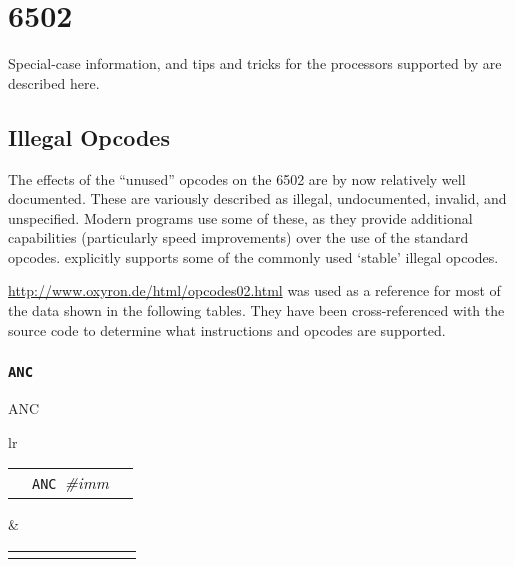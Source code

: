 \label{changelog20200901_nop3}

\chapter{6502}

Special-case information, and tips and tricks for the processors supported by \dasm are described here.

\label{changelog:20200904illegal}
\section{Illegal Opcodes}

The effects of the ``unused'' opcodes on the 6502 are by now relatively well documented. These are variously described as illegal, undocumented, invalid, and unspecified. Modern programs use some of these, as they provide additional capabilities (particularly speed improvements) over the use of the standard opcodes. \dasm explicitly supports some of the commonly used `stable' illegal opcodes.

\url{http://www.oxyron.de/html/opcodes02.html} was used as a reference for most of the data shown in the following tables. They have been cross-referenced with the \dasm source code to determine what instructions and opcodes are supported.

\iffalse
\subsection{\texttt{ANC}}
\begin{usage}
 ANC 
\end{usage}

\begin{table}[H]
\begin{tabular}{lr}

\begin{tabular}{llc}

\mono{\$0B}&\texttt{ANC }\emph{\#imm}&\mono{A:=A \& \#\{imm\}}\\

\end{tabular}&

\tabcolsep=0.1cm
\begin{tabular}{|cccccccc|}
\hline
\scriptsize\mono{N}&
\scriptsize\mono{V}&
\scriptsize\mono{B}&
\scriptsize\mono{D}&
\scriptsize\mono{I}&
\scriptsize\mono{Z}&
\scriptsize\mono{C}&
\scriptsize\mono{?}\\
\hline
\mono{1}&
\mono{*}&
\mono{*}&
\mono{*}&
\mono{*}&
\mono{*}&
\mono{*}&
\mono{*}\\
\hline

\end{tabular}
\end{tabular}
\end{table}


